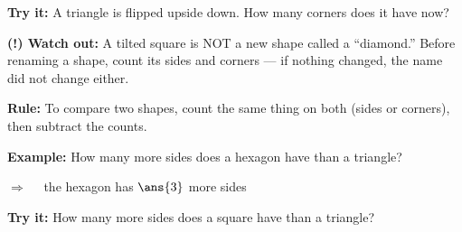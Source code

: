 \documentclass[12pt]{article}
\begin{document}
\begin{tryitbox}
\textbf{Try it:} \quad A triangle is flipped upside down. How many corners
does it have now?\\[2pt]
\end{tryitbox}

\begin{watchoutbox}
\textbf{(!) Watch out:} A tilted square is NOT a new shape called a
``diamond.'' Before renaming a shape, count its sides and corners --- if
nothing changed, the name did not change either.
\end{watchoutbox}


\begin{formulabox}
\textbf{Rule:} To compare two shapes, count the same thing on both (sides or
corners), then subtract the counts.
\end{formulabox}

\begin{examplebox}
\textbf{Example:} \quad How many more sides does a hexagon have than a
triangle?

$\Rightarrow\quad$ the hexagon has $\ans{3}$ more sides
\end{examplebox}

\begin{tryitbox}
\textbf{Try it:} \quad How many more sides does a square have than a
triangle?\\[2pt]
\end{tryitbox}
\end{document}
